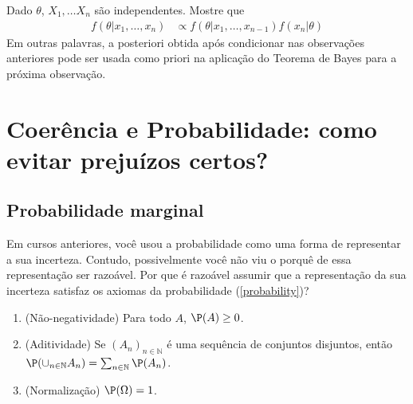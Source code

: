 \begin{exercise}
 Dado $\theta$, $X_{1}, \ldots X_{n}$ são
 independentes. Mostre que 
 \begin{align*}
  f(\theta|x_{1},\ldots,x_{n}) 
  &\propto f(\theta|x_{1},\ldots,x_{n-1})
  f(x_{n}|\theta)
 \end{align*}
 Em outras palavras, a posteriori obtida após 
 condicionar nas observações anteriores pode ser 
 usada como priori na aplicação do Teorema de Bayes para
 a próxima observação.
\end{exercise}




\newpage

\section{Coerência e Probabilidade: 
como evitar prejuízos certos?}

\subsection{Probabilidade marginal}

Em cursos anteriores,
você usou a probabilidade como
uma forma de representar a sua incerteza.
Contudo, possivelmente você não viu o porquê
de essa representação ser razoável.
Por que é razoável assumir
que a representação da sua incerteza satisfaz
os axiomas da probabilidade (\cref{probability})?

\begin{enumerate}
 \item (Não-negatividade) Para todo $A$, 
 $\P(A) \geq 0$.
 \item (Aditividade) Se $(A_{n})_{n \in \mathbb{N}}$ é
 uma sequência de conjuntos disjuntos, então
 $\P(\cup_{n \in \mathbb{N}}{A_{n}}) = \sum_{n \in \mathbb{N}}{\P(A_{n})}$.
 \item (Normalização) $\P(\Omega) = 1$.
\end{enumerate}

